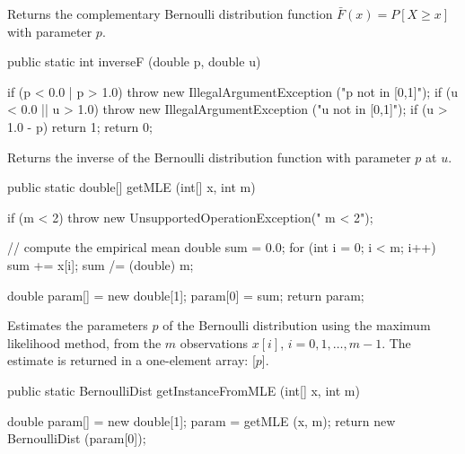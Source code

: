   \begin{tabb}  Returns the complementary Bernoulli distribution
  function $\bar F(x) = P[X \ge x]$ with parameter $p$.
 \end{tabb}
\begin{code}

   public static int inverseF (double p, double u) \begin{hide} {
      if (p < 0.0 | p > 1.0)
         throw new IllegalArgumentException ("p not in [0,1]");
      if (u < 0.0 || u > 1.0)
         throw new IllegalArgumentException ("u not in [0,1]");
      if (u > 1.0 - p) return 1;
      return 0;
    }\end{hide}
\end{code}
\begin{tabb}  Returns the inverse of the Bernoulli distribution function
 with parameter $p$ at $u$.
\end{tabb}
\begin{code}

   public static double[] getMLE (int[] x, int m)\begin{hide} {
      if (m < 2)
         throw new UnsupportedOperationException(" m < 2");

      // compute the empirical mean
      double sum = 0.0;
      for (int i = 0; i < m; i++)
         sum += x[i];
      sum /= (double) m;

      double param[] = new double[1];
      param[0] = sum;
      return param;
   }\end{hide}
\end{code}
\begin{tabb}
   Estimates the parameters $p$ of the Bernoulli distribution
   using the maximum likelihood method, from the $m$ observations
   $x[i]$, $i = 0, 1,\ldots, m-1$. The estimate is returned in a one-element
    array: [$p$].
\end{tabb}
\begin{htmlonly}
\end{htmlonly}
\begin{code}

   public static BernoulliDist getInstanceFromMLE (int[] x, int m)\begin{hide} {
      double param[] = new double[1];
      param = getMLE (x, m);
      return new BernoulliDist (param[0]);
   }\end{hide}
\end{code}
